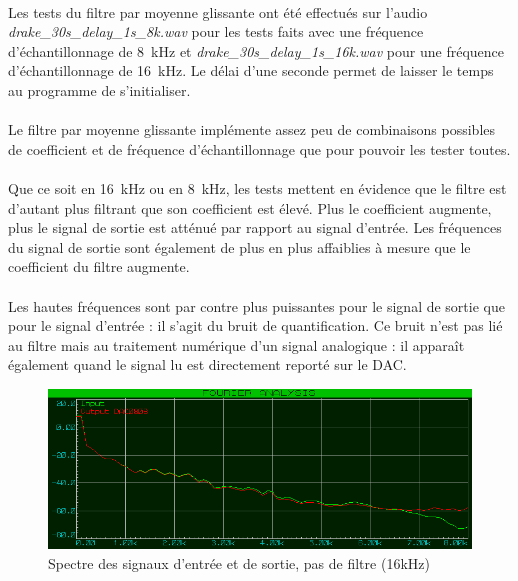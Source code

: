\documentclass{article}
\begin{document}
    \paragraph{}
    Les tests du filtre par moyenne glissante ont été effectués sur l'audio \emph{drake\_30s\_delay\_1s\_8k.wav} pour les tests faits avec une fréquence d'échantillonnage de \SI{8}{\kilo\hertz} et \emph{drake\_30s\_delay\_1s\_16k.wav} pour une fréquence d'échantillonnage de \SI{16}{\kilo\hertz}. Le délai d'une seconde permet de laisser le temps au programme de s'initialiser.

    \paragraph{}
    Le filtre par moyenne glissante implémente assez peu de combinaisons possibles de coefficient et de fréquence d'échantillonnage que pour pouvoir les tester toutes.

    \paragraph{}
    Que ce soit en \SI{16}{\kilo\hertz} ou en \SI{8}{\kilo\hertz}, les tests mettent en évidence que le filtre est d'autant plus filtrant que son coefficient est élevé. Plus le coefficient augmente, plus le signal de sortie est atténué par rapport au signal d'entrée. Les fréquences du signal de sortie sont également de plus en plus affaiblies à mesure que le coefficient du filtre augmente.

    \paragraph{}
    Les hautes fréquences sont par contre plus puissantes pour le signal de sortie que pour le signal d'entrée : il s'agit du bruit de quantification. Ce bruit n'est pas lié au filtre mais au traitement numérique d'un signal analogique : il apparaît également quand le signal lu est directement reporté sur le DAC.

    \begin{figure}[H]
        \centering
        \includegraphics[width=.6\textwidth]{./images/spectrum_no_filter_drake_16k.png}
        \caption{Spectre des signaux d'entrée et de sortie, pas de filtre (16kHz)}
    \end{figure}
\end{document}
